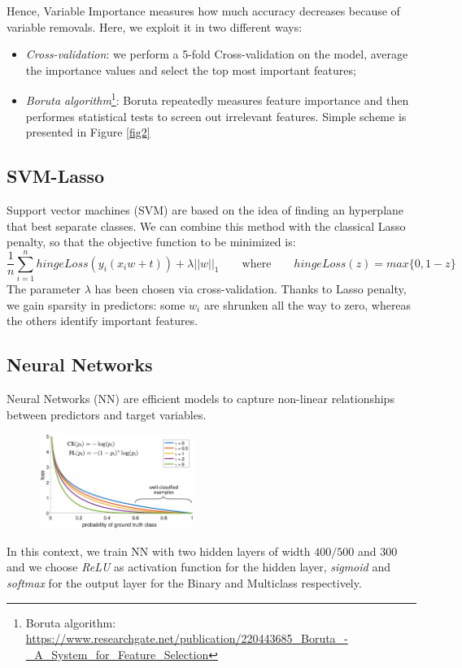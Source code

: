 \documentclass[a4paper,11pt, oneside]{article}  %
\begin{document}
Hence, Variable Importance measures how much accuracy decreases because of variable removals. Here, we exploit it in two different ways:
\begin{itemize}
	\item \textit{Cross-validation}: we perform a 5-fold Cross-validation on the model, average the importance values and select the top most important features;
	\item \textit{Boruta algorithm}\footnote{Boruta algorithm: \url{https://www.researchgate.net/publication/220443685_Boruta_-_A_System_for_Feature_Selection}}: Boruta repeatedly measures feature importance and then performes statistical tests to screen out irrelevant features. Simple scheme is presented in Figure \ref{fig2}
\end{itemize} 

\subsection{SVM-Lasso}
Support vector machines (SVM) are based on the idea of finding an hyperplane that best separate classes. We can combine this method with the classical Lasso penalty,  so that the objective function to be minimized is:
\begin{equation*}
	\dfrac{1}{n} \sum_{i=1}^n hingeLoss(y_i(x_i w + t)) + \lambda ||w||_1  \qquad	\text{where} \qquad  hingeLoss(z) = max\{0, 1-z\}
\end{equation*}
The parameter $\lambda$ has been chosen via cross-validation. Thanks to Lasso penalty, we gain sparsity in predictors: some $w_i$ are shrunken all the way to zero, whereas the others identify important features. 

\subsection{Neural Networks}
Neural Networks (NN) are efficient models to capture non-linear relationships between predictors and target variables.

\begin{figure}
	\includegraphics[width=0.45\textwidth]{nn-focal-loss.png}
	\label{fig3}
\end{figure}
In this context, we train NN with two hidden layers of width $400/500$ and $300$ and we choose \textit{ReLU} as activation function for the hidden layer, \textit{sigmoid} and \textit{softmax} for the output layer for the  Binary and Multiclass respectively.
\end{document}
